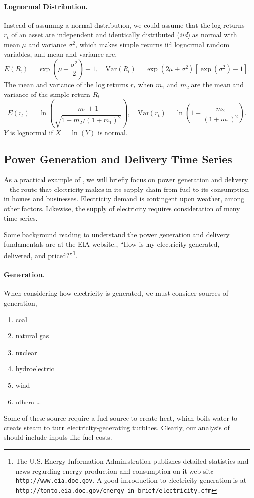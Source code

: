 \paragraph{Lognormal Distribution.} Instead of assuming a normal distribution, we could assume that the log returns $r_t$ of an asset are independent and identically distributed (\emph{iid}) as normal with mean $\mu$ and variance $\sigma^2$, which makes simple returns iid lognormal random variables, and mean and variance are,
\[
E(R_t)=\exp \left( \mu + \frac{\sigma^2}{2} \right) -1, \quad
\text{Var}(R_t) = \exp(2\mu+\sigma^2)[\exp(\sigma^2)-1].
\]
The mean and variance of the log returns $r_t$ when $m_1$ and $m_2$ are the mean and variance of the simple return $R_t$
\[
E(r_t) = \ln \left( \frac{m_1+1}{\sqrt{1+m_2 / (1+m_1)^2}} \right), \quad
\text{Var}(r_t)=\ln \left( 1+\frac{m_2}{(1+m_1)^2} \right).
\]
$Y$ is lognormal if $X = \ln(Y)$ is normal.

\subsection{Power Generation and Delivery Time Series}
As a practical example of \fts{}, we will briefly focus on power generation and delivery -- the route that electricity makes in its supply chain from fuel to its consumption in homes and businesses. Electricity demand is contingent upon weather, among other factors. Likewise, the supply of electricity requires consideration of many time series.

Some background reading to understand the power generation and delivery fundamentals are at the EIA website., ``How is my electricity generated, delivered, and priced?''\footnote{The U.S. Energy Information Administration publishes detailed statistics and news regarding energy production and consumption on it web site \texttt{http://www.eia.doe.gov}. A good introduction to electricity generation is at  \texttt{http://tonto.eia.doe.gov/energy\_in\_brief/electricity.cfm}}.

\paragraph{Generation.} When considering how electricity is generated, we must consider sources of generation,
\begin{enumerate}
	\item coal
	\item natural gas
	\item nuclear
	\item hydroelectric
	\item wind
	\item others \ldots
\end{enumerate}
Some of these source require a fuel source to create heat, which boils water to create steam to turn electricity-generating turbines. Clearly, our analysis of \fts{} should include inputs like fuel costs.

